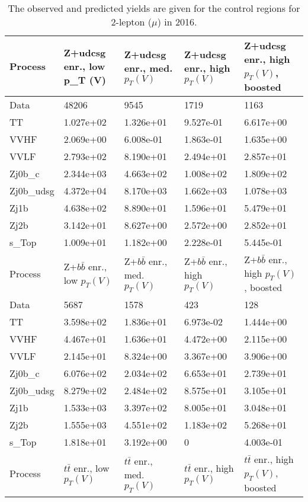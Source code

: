 \begin{table}
\centering
\caption[2016 2-lepton ($\mu$) control region yields]{
                  The observed and predicted yields are given for the
                  control regions for 2-lepton ($\mu$) in 2016.
                  }
{\footnotesize
\begin{tabularx}{\textwidth}{|X|X|X|X|X|}
\hline
Process & Z+udcsg enr., low p_{T} (V) & Z+udcsg enr., med. $p_{T}(V)$ & Z+udcsg enr., high $p_{T}(V)$ & Z+udcsg enr., high $p_{T}(V)$, boosted \\
\hline
Data & 48206 & 9545 & 1719 & 1163 \\
\hline
TT & 1.027e+02 & 1.326e+01 & 9.527e-01 & 6.617e+00 \\
VVHF & 2.069e+00 & 6.008e-01 & 1.863e-01 & 1.635e+00 \\
VVLF & 2.793e+02 & 8.190e+01 & 2.494e+01 & 2.857e+01 \\
Zj0b\_c & 2.344e+03 & 4.663e+02 & 1.008e+02 & 1.809e+02 \\
Zj0b\_udsg & 4.372e+04 & 8.170e+03 & 1.662e+03 & 1.078e+03 \\
Zj1b & 4.638e+02 & 8.890e+01 & 1.596e+01 & 5.479e+01 \\
Zj2b & 3.142e+01 & 8.627e+00 & 2.572e+00 & 2.852e+01 \\
s\_Top & 1.009e+01 & 1.182e+00 & 2.228e-01 & 5.445e-01 \\
\hline
\hline
Process & Z+$b\bar{b}$ enr., low $p_{T}(V)$ & Z+$b\bar{b}$ enr., med. $p_{T}(V)$ & Z+$b\bar{b}$ enr., high $p_{T}(V)$ & Z+$b\bar{b}$ enr., high $p_{T}(V)$, boosted \\
\hline
Data & 5687 & 1578 & 423 & 128 \\
\hline
TT & 3.598e+02 & 1.836e+01 & 6.973e-02 & 1.444e+00 \\
VVHF & 4.467e+01 & 1.636e+01 & 4.472e+00 & 2.115e+00 \\
VVLF & 2.145e+01 & 8.324e+00 & 3.367e+00 & 3.906e+00 \\
Zj0b\_c & 6.076e+02 & 2.034e+02 & 6.653e+01 & 2.739e+01 \\
Zj0b\_udsg & 8.279e+02 & 2.484e+02 & 8.575e+01 & 3.105e+01 \\
Zj1b & 1.533e+03 & 3.397e+02 & 8.005e+01 & 3.048e+01 \\
Zj2b & 1.555e+03 & 4.551e+02 & 1.183e+02 & 5.268e+01 \\
s\_Top & 1.818e+01 & 3.192e+00 & 0 & 4.003e-01 \\
\hline
\hline
Process & $t\bar{t}$ enr., low $p_{T}(V)$ & $t\bar{t}$ enr., med. $p_{T}(V)$ & $t\bar{t}$ enr., high $p_{T}(V)$ & $t\bar{t}$ enr., high $p_{T}(V)$, boosted \\

\end{tabularx}}
\end{table}
